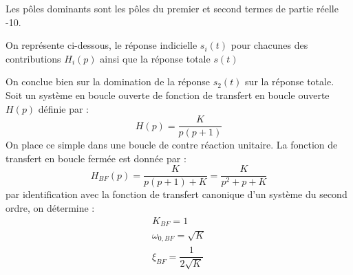 Les pôles dominants sont les pôles du premier et second termes de partie réelle -10.
\begin{center}
    
\end{center}
On représente ci-dessous,
le réponse indicielle $s_i(t)$ pour chacunes des contributions
$H_i(p)$ ainsi que la réponse totale $s(t)$
\begin{center}
    
\end{center}
On conclue bien sur la domination de la réponse $s_2(t)$ sur la réponse totale.
\clearpage
Soit un système en boucle ouverte de fonction de transfert en 
boucle ouverte $H(p)$ définie  par :
\[
H(p)=\dfrac{K}{p(p+1)}
\]
On place ce simple dans une boucle de contre réaction unitaire.
La fonction de transfert en boucle fermée est donnée par :
\[
H_{BF}(p)=\dfrac{K}{p(p+1)+K}=\dfrac{K}{p^2+p+K}
\]
par identification avec la fonction de transfert canonique d'un système 
du second ordre, on détermine :
\begin{align*}
K_{BF}=1\\
\omega_{0,BF}=\sqrt{K}\\
\xi_{BF}=\dfrac{1}{2\sqrt{K}}\\
\end{align*}
